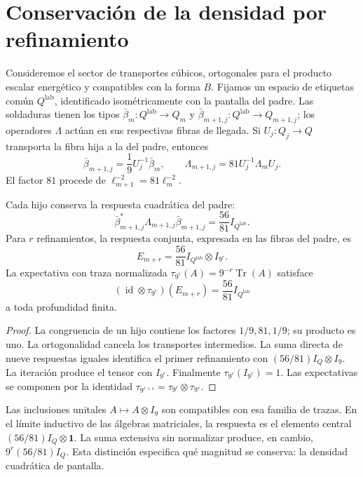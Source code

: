 \section{Conservación de la densidad por refinamiento}
\label{x_reciprocidad:vii:sec:densidad-refinamiento}

Consideremos el sector de transportes cúbicos, ortogonales para el producto
escalar energético y compatibles con la forma \(B\). Fijamos un
espacio de etiquetas común \(Q^{\mathrm{lab}}\), identificado
isométricamente con la pantalla del padre. Las soldaduras tienen
los tipos
\(\bar\beta_m:Q^{\mathrm{lab}}\longrightarrow Q_m\) y
\(\bar\beta_{m+1,j}:Q^{\mathrm{lab}}\longrightarrow Q_{m+1,j}\);
los operadores \(\Lambda\) actúan en sus respectivas fibras de llegada.
Si
\(U_j:Q_j\longrightarrow Q\) transporta la fibra hija a la del padre,
entonces
\[
 \bar\beta_{m+1,j}=\frac19U_j^{-1}\bar\beta_m,\qquad
 \Lambda_{m+1,j}=81U_j^{-1}\Lambda_mU_j.
\]
El factor \(81\) procede de \(\ell_{m+1}^{-2}=81\ell_m^{-2}\).

\begin{theorem}
\label{x_reciprocidad:vii:thm:densidad}
Cada hijo conserva la respuesta cuadrática del padre:
\[
 \bar\beta_{m+1,j}^*\Lambda_{m+1,j}\bar\beta_{m+1,j}
 =\frac{56}{81}I_{Q^{\mathrm{lab}}}.
\]
Para \(r\) refinamientos, la respuesta conjunta, expresada en las fibras
del padre, es
\[
 E_{m+r}=\frac{56}{81}I_{Q^{\mathrm{lab}}}\otimes I_{9^r}.
\]
La expectativa con traza normalizada
\(\tau_{9^r}(A)=9^{-r}\operatorname{Tr}(A)\) satisface
\[
 (\operatorname{id}\otimes\tau_{9^r})(E_{m+r})
 =\frac{56}{81}I_{Q^{\mathrm{lab}}}
\]
a toda profundidad finita.
\end{theorem}

\begin{proof}
La congruencia de un hijo contiene los factores \(1/9,81,1/9\);
su producto es uno. La ortogonalidad cancela los transportes
intermedios. La suma directa de nueve respuestas iguales identifica
el primer refinamiento con \((56/81)I_Q\otimes I_9\).
La iteración produce el tensor con \(I_{9^r}\).
Finalmente \(\tau_{9^r}(I_{9^r})=1\). Las expectativas se componen
por la identidad
\(\tau_{9^{r+s}}=\tau_{9^r}\otimes\tau_{9^s}\).
\end{proof}

Las inclusiones unitales \(A\mapsto A\otimes I_9\) son compatibles con
esa familia de trazas. En el límite inductivo de las álgebras matriciales,
la respuesta es el elemento central
\((56/81)I_Q\otimes\mathbf1\). La suma extensiva sin normalizar produce,
en cambio, \(9^r(56/81)I_Q\). Esta distinción especifica qué magnitud
se conserva: la densidad cuadrática de pantalla.

